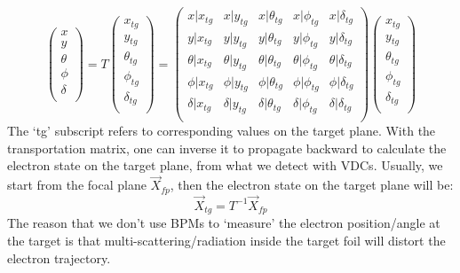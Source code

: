 \begin{equation}
    \begin{pmatrix}
	x   \\
	y   \\
	\theta	\\
	\phi	\\
	\delta	\\
    \end{pmatrix}
    =
    T
    \begin{pmatrix}
	x_{tg}   \\
	y_{tg}   \\
	\theta_{tg}	\\
	\phi_{tg}	\\
	\delta_{tg}	\\
    \end{pmatrix}
    =
    \begin{pmatrix}
	x|x_{tg} & x|y_{tg}   & x|\theta_{tg}	& x|\phi_{tg}    & x|\delta_{tg}    \\
	y|x_{tg} & y|y_{tg}   & y|\theta_{tg}	& y|\phi_{tg}    & y|\delta_{tg}    \\
	\theta|x_{tg} & \theta|y_{tg}   & \theta|\theta_{tg}	& \theta|\phi_{tg}    & \theta|\delta_{tg}    \\
	\phi|x_{tg} & \phi|y_{tg}   & \phi|\theta_{tg}	& \phi|\phi_{tg}    & \phi|\delta_{tg}    \\
	\delta|x_{tg} & \delta|y_{tg}   & \delta|\theta_{tg}	& \delta|\phi_{tg}    & \delta|\delta_{tg}    \\
    \end{pmatrix}
    \begin{pmatrix}
	x_{tg}   \\
	y_{tg}   \\
	\theta_{tg}	\\
	\phi_{tg}	\\
	\delta_{tg}	\\
    \end{pmatrix}
\end{equation}
The `tg' subscript refers to corresponding values on the target plane. 
With the transportation matrix, one can inverse it to propagate backward 
to calculate the electron state on the target plane, 
from what we detect with VDCs. Usually, we start from the focal plane $\vec{X}_{fp}$, 
then the electron state on the target plane will be: 
\begin{equation}
    \vec{X}_{tg} = T^{-1} \vec{X}_{fp}
    \label{eq:reconstruction}
\end{equation}
The reason that we don't use BPMs to `measure' the electron position/angle at 
the target is that multi-scattering/radiation inside the target foil will 
distort the electron trajectory. 

